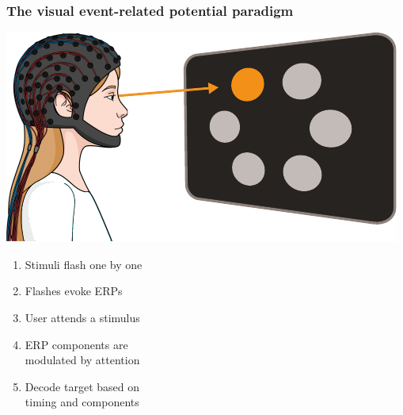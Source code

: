 \documentclass{kul-ulille-beamer}
\begin{document}
\begin{frame}
  \frametitle{The visual event-related potential  paradigm}
  \begin{minipage}[c]{.4\textwidth}
    \includegraphics[width=\textwidth]{figures/intro/oddball.pdf}
    \smallskip


  \end{minipage}\hfill%
  \begin{minipage}[c]{.5\textwidth}
    \begin{enumerate}
      \item Stimuli flash one by one
      \smallskip
      \item Flashes evoke ERPs
      \smallskip
      \item User attends a stimulus
      \smallskip
      \item ERP components are \\ modulated by attention
      \smallskip
      \item Decode target based on \\ timing and components
    \end{enumerate}
  \end{minipage}
\end{frame}


\end{document}
